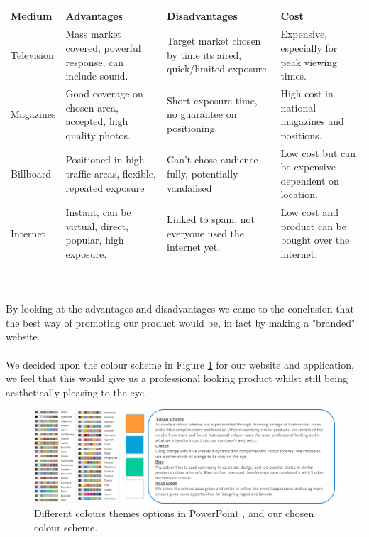 \documentclass[10pt, a4paper]{article}
\begin{document}
\begin{tabular}{| p{1.5cm} | p{5cm} | p{5cm} | p{5cm} |}
	\hline
	Medium & Advantages & Disadvantages & Cost \\
    \hline
    Television & Mass market covered, powerful response, can include sound. & Target market chosen by time its aired, quick/limited exposure & Expensive, especially for peak viewing times. \\
    \hline
	Magazines & Good coverage on chosen area, accepted, high quality photos. & Short exposure time, no guarantee on positioning. & High cost in national magazines and positions. \\
    \hline
	Billboard & Positioned in high traffic areas, flexible, repeated exposure & Can't chose audience fully, potentially vandalised & Low cost but can be expensive dependent on location. \\
    \hline
	Internet & Instant, can be virtual, direct, popular, high exposure. & Linked to spam, not everyone used the internet yet. & Low cost and product can be bought over the internet. \\
    \hline
\end{tabular}
\\\\
By looking at the advantages and disadvantages we came to the conclusion that the best way of promoting our product would be, in fact by making a "branded" website.\\\\
We decided upon the colour scheme in Figure \ref{colours} for our website and application, we feel that this would give us a professional looking product whilst still being aesthetically pleasing to the eye.
\begin{figure}[!h]
	\begin{center}
		\includegraphics[width=19cm]{images/Picture3.png}
		\caption{Different colours themes options in PowerPoint \cite{powerpointcolours}, and our chosen colour scheme.}
		\label{colours}
	\end{center}
\end{figure}


\end{document}
